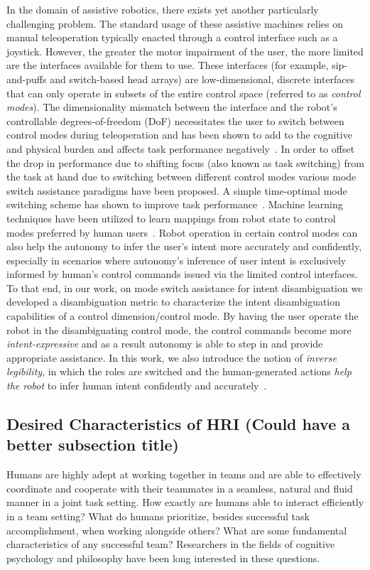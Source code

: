\documentclass[12pt]{article}
\begin{document}
In the domain of assistive robotics, there exists yet another particularly challenging problem. The standard usage of these assistive machines relies on manual teleoperation typically enacted through a control interface such as a joystick. However, the greater the motor impairment of the user, the more limited are the interfaces available for them to use. These interfaces (for example, sip-and-puffs and switch-based head arrays) are low-dimensional, discrete interfaces that can only operate in subsets of the entire control space (referred to as \textit{control modes}). The dimensionality mismatch between the interface and the robot's controllable degrees-of-freedom (DoF) necessitates the user to switch between control modes during teleoperation and has been shown to add to the cognitive and physical burden and affects task performance negatively~\cite{pilarski2012dynamic}.
In order to offset the drop in performance due to shifting focus (also known as task switching) from the task at hand due to switching between different control modes various mode switch assistance paradigms have been proposed. A simple time-optimal mode switching scheme has shown to improve task performance~\cite{herlant2016assistive}. Machine learning techniques have been utilized to learn mappings from robot state to control modes preferred by human users~\cite{jainrobot}. Robot operation in certain control modes can also help the autonomy to infer the user's intent more accurately and confidently, especially in scenarios where autonomy's inference of user intent is exclusively informed by human's control commands issued via the limited control interfaces. To that end, in our work, on mode switch assistance for intent disambiguation we developed a disambiguation metric to characterize the intent disambiguation capabilities of a control dimension/control mode. By having the user operate the robot in the disambiguating control mode, the control commands become more \textit{intent-expressive} and as a result autonomy is able to step in and provide appropriate assistance. In this work, we also introduce the notion of \textit{inverse legibility}, in which the roles are switched and the human-generated actions \textit{help the robot} to infer human intent confidently and accurately~\cite{gopinath2017mode}. 

\subsection{Desired Characteristics of HRI (Could have a better subsection title)}
Humans are highly adept at working together in teams and are able to effectively coordinate and cooperate with their teammates in a seamless, natural and fluid manner in a joint task setting. How exactly are humans able to interact efficiently in a team setting?  What do humans prioritize, besides successful task accomplishment, when working alongside others? What are some fundamental characteristics of any successful team? Researchers in the fields of cognitive psychology and  philosophy have been long interested in these questions. 
\end{document}

